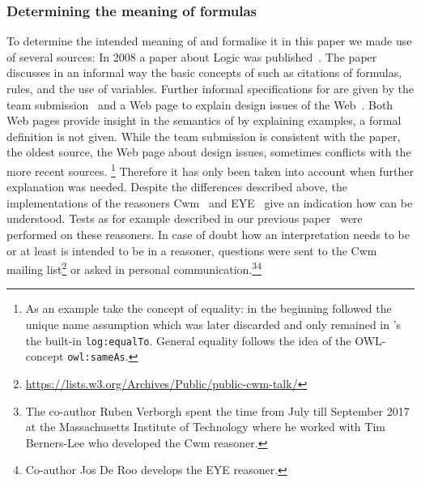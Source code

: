 \subsubsection{Determining the meaning of \nthree formulas}
To determine the intended meaning of \nthree and formalise it in this paper we made use of several sources: 
In 2008  a paper about 
\notationthree Logic was published~\cite{N3Logic}. 
The paper discusses in an informal way the basic concepts of \nthree such as citations of formulas, rules, and the use of variables. Further informal specifications for \nthree 
are given by %
the \wwwc team submission~\cite{Notation3} and a Web page to explain design issues of the Web~\cite{Notation32}.
Both Web pages provide 
insight in the semantics of \nthree by explaining examples, a formal definition is not given.
While the \wwwc team submission is consistent with the paper, the oldest source, the Web page about design issues, sometimes
conflicts with the more recent sources.%
\footnote{As an example take the concept of equality: in the beginning \nthree followed the unique name assumption which was later discarded and only remained in \nthree's 
the built-in \texttt{log:equalTo}. General equality follows the idea of the OWL-concept \texttt{owl:sameAs}.
} 
Therefore it has only been taken into account when further explanation was needed.
%
Despite the differences described above, the implementations of the reasoners Cwm~\cite{cwm} and EYE~\cite{eye} give an indication how \nthree can be 
understood. 
Tests as for example 
described in 
our previous paper~\cite{arndt_ruleml_2015} were performed on these reasoners. 
In case of doubt how an interpretation needs to be or at least is intended to be in a reasoner, questions were sent to the Cwm mailing list\footnote{\url{https://lists.w3.org/Archives/Public/public-cwm-talk/}}
or asked in personal communication.\footnote{The co-author Ruben Verborgh spent the time from July till September 2017 at the Massachusetts Institute of Technology where
he worked with Tim Berners-Lee who developed the Cwm reasoner.}\footnote{Co-author Jos De Roo develops the EYE reasoner.}

